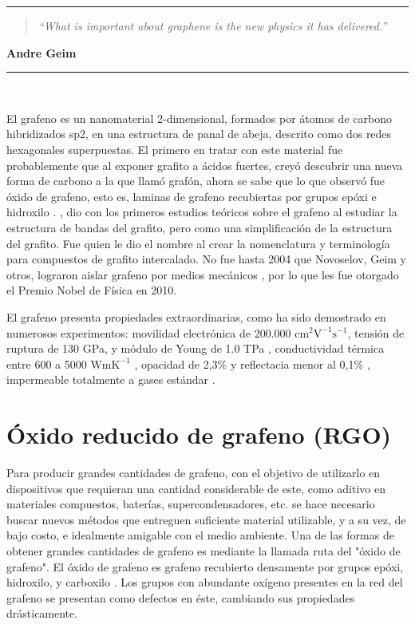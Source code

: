 \noindent
\rule{\linewidth}{1 pt}
\begin{flushright}
	\begin{quotation}
		\small{
			\textit{``What is important about graphene is the new physics it has delivered.''}}
	\end{quotation}
	\bf{Andre Geim}
\end{flushright}
\noindent
\rule{\linewidth}{1 pt}\\
\vfill

El grafeno es un nanomaterial 2-dimensional, formados por átomos de carbono  hibridizados sp2, en una estructura de panal de abeja, descrito como dos redes hexagonales superpuestas. El primero en tratar con este material fue probablemente \citet{Brodie1859} que al exponer grafito a ácidos fuertes, creyó descubrir una nueva forma de carbono a la que llamó grafón, ahora se sabe que lo que observó fue óxido de grafeno, esto es, laminas de grafeno recubiertas por grupos epóxi e hidroxilo \citep{Geim2012}. \citet{Wallace1947}, dio con los primeros estudios teóricos sobre el grafeno al estudiar la estructura de bandas del grafito, pero como una simplificación de la estructura del grafito. Fue \citet{Boehm1986} quien le dio el nombre al crear la nomenclatura y terminología para compuestos de grafito intercalado. No fue hasta 2004 que Novoselov, Geim y otros, lograron aislar grafeno por medios mecánicos \citep{Novoselov2004}, por lo que les fue otorgado el Premio Nobel de Física en 2010.

El grafeno presenta propiedades extraordinarias, como ha sido demostrado en numerosos experimentos: movilidad electrónica de 200.000 $\mathrm{cm^2 V^{-1} s^{-1} }$\citep{Bolotin2008}, tensión de ruptura de 130 GPa, y módulo de Young de 1.0 TPa \citep{Lee2008}, conductividad térmica entre 600 a 5000 $\mathrm{W mK^{-1}}$ \citep{Balandin2011}, opacidad de 2,3\% y reflectacia menor al 0,1\% \citep{Nair2008}, impermeable totalmente a gases estándar \cite{Bunch2008}.

\section{Óxido reducido de grafeno (RGO)}
Para producir grandes cantidades de grafeno, con el objetivo de utilizarlo en dispositivos que requieran una cantidad considerable de este, como aditivo en materiales compuestos, baterías, supercondensadores, etc. se hace necesario buscar nuevos métodos que entreguen suficiente material utilizable, y a su vez, de bajo costo, e idealmente amigable con el medio ambiente.
Una de las formas de obtener grandes cantidades de grafeno es mediante la llamada ruta del "óxido de grafeno". El óxido de grafeno es grafeno recubierto densamente por grupos epóxi, hidroxilo, y carboxilo \citep{Gao2015}. Los grupos con abundante oxígeno presentes en la red del grafeno se presentan como defectos en éste, cambiando sus propiedades drásticamente.



